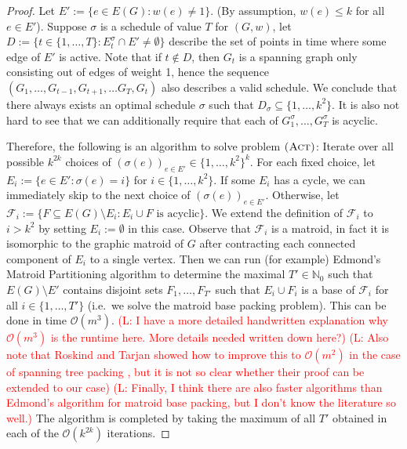 \documentclass[runningheads]{llncs}
\numberwithin{equation}{section}
\newcommand{\N}{\mathbb{N}}
\newcommand{\set}[1]{\{ #1 \}}
\newcommand{\fromto}[2]{\set{#1, \ldots, #2}}
\newcommand{\comment}[1]{\textcolor{red}{(L: #1)}}
\newcommand{\bigO}{\mathcal{O}}
\newcommand{\act}{\textsc{(Act)}}
\begin{document}
\begin{proof}
Let $E' := \set{e \in E(G) : w(e) \neq 1}$. (By assumption, $w(e) \leq k$ for all $e \in E'$). Suppose $\sigma$ is a schedule of value $T$ for $(G, w)$, let $D := \set{t \in \fromto{1}{T} : E_t^\sigma \cap E' \neq \emptyset}$ describe the set of points in time where some edge of $E'$ is active. Note that  if $t \not\in D$, then $G_t$ is a spanning graph only consisting out of edges of weight 1, hence the sequence $(G_1, \dots, G_{t-1}, G_{t+1}, \dots G_T, G_t)$ also describes a valid schedule. We conclude that there always exists an optimal schedule $\sigma$ such that $D_\sigma \subseteq \fromto{1}{k^2}$. It is also not  hard to see that we can additionally require that each of $G_1^\sigma, \dots, G_T^\sigma$ is acyclic.

Therefore, the following is an algorithm to solve problem $\act$: Iterate over all possible $k^{2k}$ choices of $(\sigma(e))_{e \in E'} \in \fromto{1}{k^2}^k$. For each fixed choice, let $E_i := \set{e \in E' : \sigma(e) = i}$ for $i \in \fromto{1}{k^2}$. If some $E_i$ has a cycle, we can immediately skip to the next choice of $(\sigma(e))_{e \in E'}$. Otherwise, let $\mathcal{F}_i := \set{F \subseteq E(G) \setminus E_i : E_i \cup F \text{ is acyclic}}$. We extend the definition of $\mathcal{F}_i$ to $i > k^2$ by setting $E_i := \emptyset$ in this case. Observe that $\mathcal{F}_i$ is a matroid, in fact it is isomorphic to the graphic matroid of $G$ after contracting each connected component of $E_i$ to a single vertex. Then we can run (for example)
 Edmond's Matroid Partitioning algorithm to determine the maximal $T' \in \N_0$ such that $E(G) \setminus E'$ contains disjoint sets $F_1, \dots, F_{T'}$ such that $E_i \cup F_i$ is a base of $\mathcal{F}_i$ for all $i \in \fromto{1}{T'}$ (i.e.\ we solve the matroid base packing problem). This can be done in time $\bigO(
m^3)$. \comment{I have a more detailed handwritten explanation why $\bigO(m^3)$ is the runtime here. More details needed written down here?} \comment{Also note that Roskind and Tarjan showed how to improve this to $\bigO(m^2)$ in the case of spanning tree packing \cite{STPMatroidImprovement}, but it is not so clear whether their proof can be extended to our case} \comment{Finally, I think there are also faster algorithms than Edmond's algorithm for matroid base packing, but I don't know the literature so well.} The algorithm is completed by taking the maximum of all $T'$ obtained in each of the $\bigO(k^{2k})$ iterations.
\end{proof}
\end{document}
